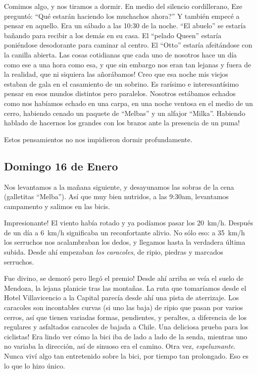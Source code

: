 Comimos algo, y nos tiramos a dormir. En medio del silencio cordillerano, Eze
pregunt\'o: ``\textquestiondown Qu\'e estar\'an haciendo los muchachos ahora?''
Y tambi\'en empec\'e a pensar en aquello. Era un s\'abado a las 10:30 de la
noche. ``El abuelo'' se estar\'ia ba\~nando para recibir a los dem\'as en su
casa. El ``pelado Queen'' estar\'ia poni\'endose desodorante para caminar al
centro. El ``Otto'' estar\'ia afeit\'andose con la canilla abierta.
\textexclamdown Las cosas cotidianas que cada uno de nosotros hace un d\'ia como
ese a una hora como esa, y que sin embargo nos eran tan lejanas y fuera de la
realidad, que ni siquiera las a\~nor\'abamos! Creo que esa noche mis viejos
estaban de gala en el casamiento de un sobrino. Es rar\'isimo e
interesant\'isimo pensar en esos mundos distintos pero paralelos. Nosotros
est\'abamos echados como nos hab\'iamos echado en una carpa, en una noche
ventosa en el medio de un cerro, habiendo cenado un paquete de ``Melbas'' y un
alfajor ``Milka''. \textexclamdown Habiendo hablado de hacernos los grandes con
los brazos ante la presencia de un puma!

Estos pensamientos no nos impidieron dormir profundamente.

\subsection*{Domingo 16 de Enero}

Nos levantamos a la ma\~nana siguiente, y desayunamos las sobras de la cena
(galletitas ``Melba''). As\'i que muy bien nutridos, a las 9:30am, levantamos
campamento y salimos en las bicis.

\textexclamdown Impresionante! El viento hab\'ia rotado y ya pod\'iamos pasar
los 20~km/h. Despu\'es de un d\'ia a 6~km/h significaba un reconfortante alivio.
No s\'olo eso: a 35~km/h los serruchos nos acalambraban los dedos, y llegamos
hasta la verdadera \'ultima subida. Desde ah\'i empezaban \emph{los caracoles},
de ripio, piedras y marcados serruchos.

Fue divino, \textexclamdown se demor\'o pero lleg\'o el premio! Desde ah\'i
arriba se ve\'ia el suelo de Mendoza, la lejana planicie tras las monta\~nas. La
ruta que tomar\'iamos desde el Hotel Villavicencio a la Capital parec\'ia desde
ah\'i una pista de aterrizaje. Los caracoles son incontables curvas (si uno las
baja) de ripio que pasan por varios cerros, as\'i que tienen variadas formas,
pendientes, y peraltes, a diferencia de los regulares y asfaltados caracoles de
bajada a Chile. \textexclamdown Una deliciosa prueba para los ciclistas! Era
lindo ver c\'omo la bici iba de lado a lado de la senda, mientras uno no variaba
la direcci\'on, as\'i de sinuoso era el camino. Otra vez, \emph{espeluznante}.
Nunca viv\'i algo tan entretenido sobre la bici, por tiempo tan prolongado. Eso
es lo que lo hizo \'unico.

